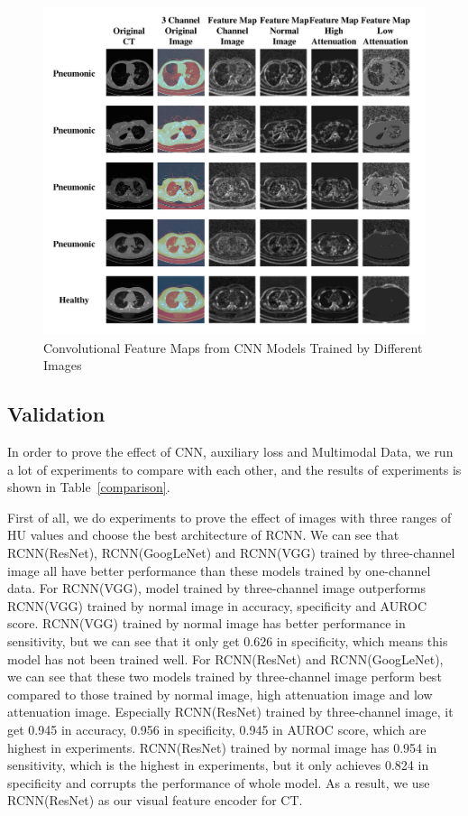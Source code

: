 \documentclass[runningheads]{llncs}
\begin{document}
\begin{figure}[t]
    \centerline{\includegraphics[width=120mm]{show.pdf}}
    \vspace{-0cm}
    \caption{Convolutional Feature Maps from CNN Models Trained by Different Images}
    \vspace{-0cm}
    \label{show}
    \end{figure}

\subsection{Validation}
\label{exp}
In order to prove the effect of CNN, auxiliary loss and Multimodal Data, we run a lot of experiments to compare with each other, and the results of experiments is shown in Table~\ref{comparison}.

First of all, we do experiments to prove the effect of images with three ranges of HU values and choose the best architecture of RCNN. We can see that RCNN(ResNet), RCNN(GoogLeNet) and RCNN(VGG) trained by three-channel image all have better performance than these models trained by one-channel data. 
For RCNN(VGG), model trained by three-channel image outperforms RCNN(VGG) trained by normal image in accuracy, specificity and AUROC score. RCNN(VGG) trained by normal image has better performance in sensitivity, but we can see that it only get 0.626 in specificity, which means this model has not been trained well. 
For RCNN(ResNet) and RCNN(GoogLeNet), we can see that these two models trained by three-channel image perform best compared to those trained by normal image, high attenuation image and low attenuation image. Especially RCNN(ResNet) trained by three-channel image, it get 0.945 in accuracy, 0.956 in specificity, 0.945 in AUROC score, which are highest in experiments. RCNN(ResNet) trained by normal image has 0.954 in sensitivity, which is the highest in experiments, but it only achieves 0.824 in specificity and corrupts the performance of whole model. As a result, we use RCNN(ResNet) as our visual feature encoder for CT.
\end{document}
